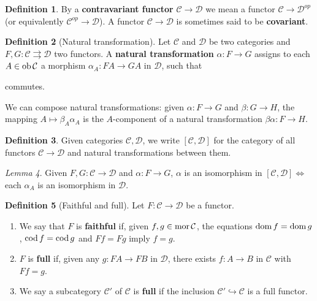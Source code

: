 \documentclass[a4paper]{article}
\theoremstyle{definition}
\newtheorem{definition}{Definition}
\theoremstyle{remark}
\theoremstyle{default}
\newtheorem{lemma}[definition]{Lemma}
\numberwithin{definition}{section}
\newcommand*\dom[1]{\textnormal{dom}\,#1}
\newcommand*\cod[1]{\textnormal{cod}\,#1}
\newcommand*\ob[1]{\textnormal{ob}\,#1}
\newcommand*\mor[1]{\textnormal{mor}\,#1}
\begin{document}
\begin{definition}
	By a \textbf{contravariant functor} $\mathcal{C} \to \mathcal{D}$ we mean a functor $\mathcal{C} \to \mathcal{D}^{op}$ (or equivalently $\mathcal{C}^{op} \to \mathcal{D}$). A functor $\mathcal{C} \to \mathcal{D}$ is sometimes said to be \textbf{covariant}.
\end{definition}

\begin{definition}[Natural transformation]
	Let $\mathcal{C}$ and $\mathcal{D}$ be two categories and $F, G: \mathcal{C} \rightrightarrows \mathcal{D}$ two functors.
	A \textbf{natural transformation} $\alpha:F\to G$ assigns to each $A \in \ob{\mathcal{C}}$ a morphism $\alpha_A:FA\to GA$ in $\mathcal{D}$, such that
	\begin{center}
	\end{center}
	commutes.
\end{definition}

We can compose natural transformations: given $\alpha: F \to G$ and $\beta: G \to H$, the mapping $A \mapsto \beta_A \alpha_A$ is the $A$-component of a natural transformation $\beta\alpha: F \to H$.

\begin{definition}
	Given categories $\mathcal{C}, \mathcal{D}$, we write $[\mathcal{C},\mathcal{D}]$ for the category of all functors $\mathcal{C} \to \mathcal{D}$ and natural transformations between them.
\end{definition}

\begin{lemma}
	Given $F,G: \mathcal{C} \to \mathcal{D}$ and $\alpha: F \to G$, $\alpha$ is an isomorphism in $[\mathcal{C}, \mathcal{D}] \iff$ each $\alpha_A$ is an isomorphism in $\mathcal{D}$.
\end{lemma}

\begin{definition}[Faithful and full]
	Let $F: \mathcal{C} \to \mathcal{D}$ be a functor.
	\begin{enumerate}[label=\alph*.]
		\item We say that $F$ is \textbf{faithful} if, given $f, g \in \mor{\mathcal{C}}$, the equations $\dom{f}=\dom{g}$, $\cod{f}=\cod{g}$ and $Ff = Fg$ imply $f=g$.
		\item $F$ is \textbf{full} if, given any $g: FA \to FB$ in $\mathcal{D}$, there exists $f: A \to B$ in $\mathcal{C}$ with $Ff =g$.
		\item We say a subcategory $\mathcal{C}'$ of $\mathcal{C}$ is \textbf{full} if the inclusion $\mathcal{C}' \hookrightarrow \mathcal{C}$ is a full functor.
	\end{enumerate}
\end{definition}
\end{document}
